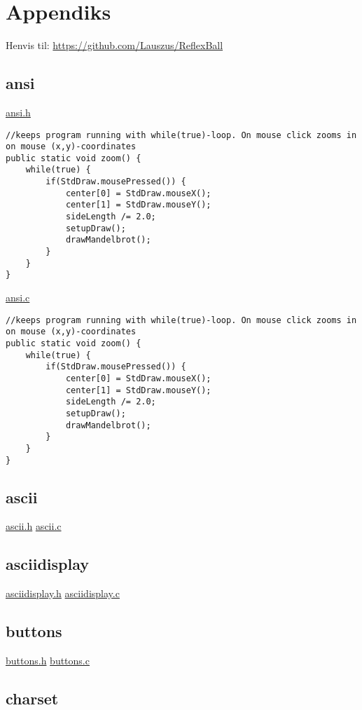 \chapter{Appendiks}
Henvis til: \url{https://github.com/Lauszus/ReflexBall}

\section{ansi}
\label{ansi}

\underline{ansi.h}
\begin{lstlisting}
//keeps program running with while(true)-loop. On mouse click zooms in on mouse (x,y)-coordinates
public static void zoom() {
	while(true) {
		if(StdDraw.mousePressed()) {
			center[0] = StdDraw.mouseX();
			center[1] = StdDraw.mouseY();
			sideLength /= 2.0;
			setupDraw();
			drawMandelbrot();
		}
	}
}
\end{lstlisting}

\underline{ansi.c}
\begin{lstlisting}
//keeps program running with while(true)-loop. On mouse click zooms in on mouse (x,y)-coordinates
public static void zoom() {
	while(true) {
		if(StdDraw.mousePressed()) {
			center[0] = StdDraw.mouseX();
			center[1] = StdDraw.mouseY();
			sideLength /= 2.0;
			setupDraw();
			drawMandelbrot();
		}
	}
}
\end{lstlisting}


\section{ascii}
\label{ascii}

\underline{ascii.h}
\underline{ascii.c}

\section{asciidisplay}
\label{asciidisplay}

\underline{asciidisplay.h}
\underline{asciidisplay.c}

\section{buttons}
\label{buttons}

\underline{buttons.h}
\underline{buttons.c}

\section{charset}
\label{charset}

